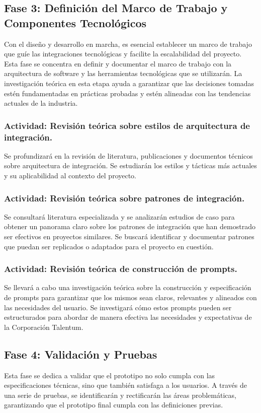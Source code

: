 \subsection{Fase 3: Definición del Marco de Trabajo y Componentes Tecnológicos}
Con el diseño y desarrollo en marcha, es esencial establecer un marco de trabajo que guíe las integraciones tecnológicas y facilite la escalabilidad del proyecto. Esta fase se concentra en definir y documentar el marco de trabajo con la arquitectura de software y las herramientas tecnológicas que se utilizarán. La investigación teórica en esta etapa ayuda a garantizar que las decisiones tomadas estén fundamentadas en prácticas probadas y estén alineadas con las tendencias actuales de la industria.

\subsubsection{Actividad: Revisión teórica sobre estilos de arquitectura de integración.}
Se profundizará en la revisión de literatura, publicaciones y documentos técnicos sobre arquitectura de integración. Se estudiarán los estilos y tácticas más actuales y su aplicabilidad al contexto del proyecto.

\subsubsection{Actividad: Revisión teórica sobre patrones de integración.}
Se consultará literatura especializada y se analizarán estudios de caso para obtener un panorama claro sobre los patrones de integración que han demostrado ser efectivos en proyectos similares. Se buscará identificar y documentar patrones que puedan ser replicados o adaptados para el proyecto en cuestión.

\subsubsection{Actividad: Revisión teórica de construcción de prompts.}
Se llevará a cabo una investigación teórica sobre la construcción y especificación de prompts para garantizar que los mismos sean claros, relevantes y alineados con las necesidades del usuario. Se investigará cómo estos prompts pueden ser estructurados para abordar de manera efectiva las necesidades y expectativas de la Corporación Talentum.

\subsection{Fase 4: Validación y Pruebas}
Esta fase se dedica a validar que el prototipo no solo cumpla con las especificaciones técnicas, sino que también satisfaga a los usuarios. A través de una serie de pruebas, se identificarán y rectificarán las áreas problemáticas, garantizando que el prototipo final cumpla con las definiciones previas.


